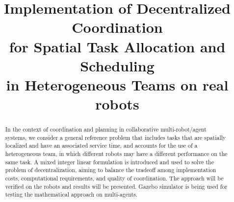 \documentclass[conference]{IEEEtran}
\begin{document}
%
\title{Implementation of Decentralized Coordination\\ for Spatial Task Allocation
and Scheduling\\ in Heterogeneous Teams on real robots}


\author{
}


% 
\maketitle

\begin{abstract}
In the context of coordination and planning in collaborative multi-robot/agent systems, we consider a general reference problem that includes tasks that are spatially localized and have an associated service time, and accounts for the use of a heterogeneous team, in which different robots may have a different performance on the same task. A mixed integer linear formulation is introduced and used to solve the problem of decentralization, aiming to balance the tradeoff among implementation costs, computational requirements, and quality of coordination\cite{feo2016decentralized}. The approach will be verified on the robots and results will be presented. Gazebo simulator is being used for testing the mathematical approach on multi-agents.
\end{abstract}
\end{document}

